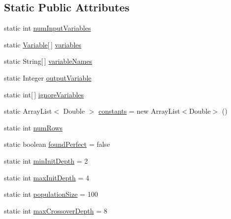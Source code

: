\subsection*{Static Public Attributes}
\begin{DoxyCompactItemize}
\item 
static int \hyperlink{classexamples_1_1gp_1_1symbolic_regression_1_1_symbolic_regression_ab647e4a7ac66ce0c543f7906d302f3e3}{num\-Input\-Variables}
\item 
static \hyperlink{classorg_1_1jgap_1_1gp_1_1terminal_1_1_variable}{Variable}\mbox{[}$\,$\mbox{]} \hyperlink{classexamples_1_1gp_1_1symbolic_regression_1_1_symbolic_regression_abaa9073c106411b861ea296c98bd3009}{variables}
\item 
static String\mbox{[}$\,$\mbox{]} \hyperlink{classexamples_1_1gp_1_1symbolic_regression_1_1_symbolic_regression_ac87f5f1e780bb2332e52011fe9d7539d}{variable\-Names}
\item 
static Integer \hyperlink{classexamples_1_1gp_1_1symbolic_regression_1_1_symbolic_regression_a41a52e03f6aaf7e0317f9f2fb14525b7}{output\-Variable}
\item 
static int\mbox{[}$\,$\mbox{]} \hyperlink{classexamples_1_1gp_1_1symbolic_regression_1_1_symbolic_regression_a24561bfc8adbe85f6e6ce74fcd008602}{ignore\-Variables}
\item 
static Array\-List$<$ Double $>$ \hyperlink{classexamples_1_1gp_1_1symbolic_regression_1_1_symbolic_regression_acb3e678854ed359a070db483c5b22cbf}{constants} = new Array\-List$<$Double$>$ ()
\item 
static int \hyperlink{classexamples_1_1gp_1_1symbolic_regression_1_1_symbolic_regression_ad5f6a203c254715be21128b6f82ab673}{num\-Rows}
\item 
static boolean \hyperlink{classexamples_1_1gp_1_1symbolic_regression_1_1_symbolic_regression_a81b11950997f88aa0fdda2e938e67772}{found\-Perfect} = false
\item 
static int \hyperlink{classexamples_1_1gp_1_1symbolic_regression_1_1_symbolic_regression_ab349b6e3c7f332656dd27d97984bc7cc}{min\-Init\-Depth} = 2
\item 
static int \hyperlink{classexamples_1_1gp_1_1symbolic_regression_1_1_symbolic_regression_a41ce468f8d781e1b1105aa420f736f61}{max\-Init\-Depth} = 4
\item 
static int \hyperlink{classexamples_1_1gp_1_1symbolic_regression_1_1_symbolic_regression_af835d7ddd8022c27dd9ad767bf2e4acd}{population\-Size} = 100
\item 
static int \hyperlink{classexamples_1_1gp_1_1symbolic_regression_1_1_symbolic_regression_a85924723eaa8ede23c6a48d5d3e950a6}{max\-Crossover\-Depth} = 8

\end{DoxyCompactItemize}
